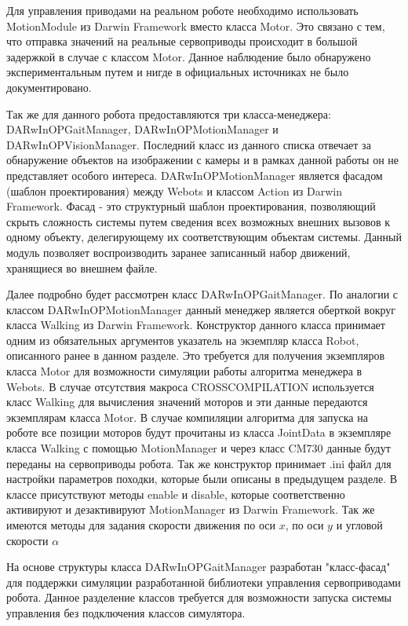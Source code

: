 Для управления приводами на реальном роботе необходимо использовать MotionModule из Darwin Framework вместо класса Motor. Это связано с тем, что отправка значений на реальные сервоприводы происходит в большой задержкой в случае с классом Motor. Данное наблюдение было обнаружено экспериментальным путем и нигде в официальных источниках не было документировано.

Так же для данного робота предоставляются три класса-менеджера: DARwInOPGaitManager, DARwInOPMotionManager и DARwInOPVisionManager. Последний класс из данного списка отвечает за обнаружение объектов на изображении с камеры и в рамках данной работы он не представляет особого интереса. DARwInOPMotionManager является фасадом (шаблон проектирования) между Webots и классом Action из Darwin Framework. Фасад - это структурный шаблон проектирования, позволяющий скрыть сложность системы путем сведения всех возможных внешних вызовов к одному объекту, делегирующему их соответствующим объектам системы. Данный модуль позволяет воспроизводить заранее записанный набор движений, хранящиеся во внешнем файле.

Далее подробно будет рассмотрен класс DARwInOPGaitManager. По аналогии с классом DARwInOPMotionManager данный менеджер является оберткой вокруг класса Walking из Darwin Framework. Конструктор данного класса принимает одним из обязательных аргументов указатель на экземпляр класса Robot, описанного ранее в данном разделе. Это требуется для получения экземпляров класса Motor для возможности симуляции работы алгоритма менеджера в Webots. В случае отсутствия макроса CROSSCOMPILATION используется класс Walking для вычисления значений моторов и эти данные передаются экземплярам класса Motor. В случае компиляции алгоритма для запуска на роботе все позиции моторов будут прочитаны из класса JointData в экземпляре класса Walking с помощью MotionManager и через класс CM730 данные будут переданы на сервоприводы робота. Так же конструктор принимает \*.ini файл для настройки параметров походки, которые были описаны в предыдущем разделе. В классе присутствуют методы enable и disable, которые соответственно активируют и дезактивируют MotionManager из Darwin Framework. Так же имеются методы для задания скорости движения по оси $x$, по оси $y$ и угловой скорости $\alpha$

На основе структуры класса DARwInOPGaitManager разработан "класс-фасад" для поддержки симуляции разработанной библиотеки управления сервоприводами робота. Данное разделение классов требуется для возможности запуска системы управления без подключения классов симулятора.


